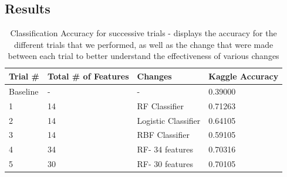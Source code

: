 \documentclass[submit]{harvardml}
\begin{document}
\subsection*{Results}

\begin{table}[H]
\centering
\caption{Classification Accuracy for successive trials - displays the accuracy for the different trials that we performed, as well as the change that were made between each trial to better understand the effectiveness of various changes}
\label{my-label}
\begin{tabular}{|l|l|l|l|}
\hline
\textbf{Trial \#} & \textbf{Total \# of Features} & \textbf{Changes}    & \textbf{Kaggle Accuracy} \\ \hline
Baseline          & -                             & -                   & 0.39000                  \\ \hline
1                 & 14                            & RF Classifier       & 0.71263                  \\ \hline
2                 & 14                            & Logistic Classifier & 0.64105                  \\ \hline
3                 & 14                            & RBF Classifier      & 0.59105                  \\ \hline
4                 & 34                            & RF- 34 features     & 0.70316                  \\ \hline
5                 & 30                            & RF- 30 features     & 0.70105                  \\ \hline
\end{tabular}
\end{table}
\end{document}

